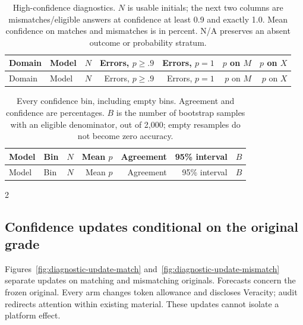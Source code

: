 \begingroup\small\setlength{\tabcolsep}{4pt}
\begin{longtable}{llrrrrr}
\caption{High-confidence diagnostics. $N$ is usable initials; the next two
columns are mismatches/eligible answers at confidence at least 0.9 and exactly
1.0. Mean confidence on matches and mismatches is in percent. N/A preserves
an absent outcome or probability stratum.}
\label{tab:diagnostic-high-confidence}\\
\toprule Domain & Model & $N$ & Errors, $p\geq.9$ & Errors, $p=1$ & $p$ on $M$ & $p$ on $X$\\\midrule\endfirsthead
\toprule Domain & Model & $N$ & Errors, $p\geq.9$ & Errors, $p=1$ & $p$ on $M$ & $p$ on $X$\\\midrule\endhead

\bottomrule\end{longtable}\endgroup

\begingroup\small\setlength{\tabcolsep}{4pt}
\begin{longtable}{llrrrrr}
\caption{Every confidence bin, including empty bins. Agreement and confidence
are percentages. $B$ is the number of bootstrap samples with an eligible
denominator, out of 2,000; empty resamples do not become zero accuracy.}
\label{tab:diagnostic-reliability}\\
\toprule Model & Bin & $N$ & Mean $p$ & Agreement & 95\% interval & $B$\\\midrule\endfirsthead
\toprule Model & Bin & $N$ & Mean $p$ & Agreement & 95\% interval & $B$\\\midrule\endhead

\bottomrule\end{longtable}\endgroup

\begin{multicols}{2}
\subsection{Confidence updates conditional on the original grade}
Figures~\ref{fig:diagnostic-update-match} and~\ref{fig:diagnostic-update-mismatch}
separate updates on matching and mismatching originals. Forecasts concern the
frozen original. Every arm changes token allowance and discloses Veracity;
audit redirects attention within existing material. These updates cannot
isolate a platform effect.
\end{multicols}

